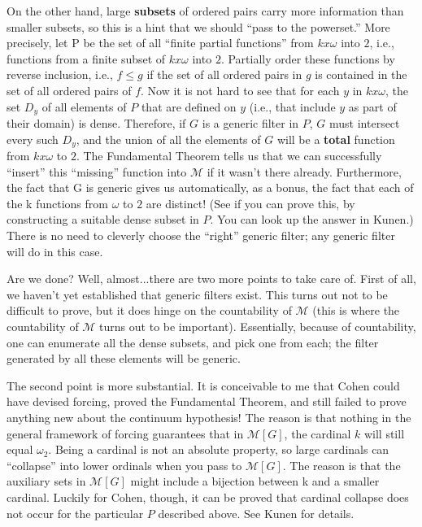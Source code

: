 \documentclass[10pt]{article}
\begin{document}
On the other hand, large \textbf{subsets} of ordered pairs carry more information than smaller subsets, so this is a hint that we should ``pass to the powerset.'' More precisely, let P be the set of all ``finite partial functions'' from $k x \omega$ into $2$, i.e., functions from a finite subset of $k x \omega$ into $2$. Partially order these functions by reverse inclusion, i.e., $f \leq g$ if the set of all ordered pairs in $g$ is contained in the set of all ordered pairs of $f$. Now it is not hard to see that for each $y$ in $k x \omega$, the set $D_y$ of all elements of $P$ that are defined on $y$ (i.e., that include $y$ as part of their domain) is dense. Therefore, if $G$ is a generic filter in $P$, $G$ must intersect every such $D_y$, and the union of all the elements of $G$ will be a \textbf{total} function from $k x \omega$ to $2$. The Fundamental Theorem tells us that we can successfully ``insert'' this ``missing'' function into $\mathcal{M}$ if it wasn't there already. Furthermore, the fact that G is generic gives us automatically, as a bonus, the fact that each of the k functions from $\omega$ to $2$ are distinct! (See if you can prove this, by constructing a suitable dense subset in $P$. You can look up the answer in Kunen.) There is no need to cleverly choose the ``right'' generic filter; any generic filter will do in this case.

Are we done? Well, almost...there are two more points to take care of. First of all, we haven't yet established that generic filters exist. This turns out not to be difficult to prove, but it does hinge on the countability of $\mathcal{M}$ (this is where the countability of $\mathcal{M}$ turns out to be important). Essentially, because of countability, one can enumerate all the dense subsets, and pick one from each; the filter generated by all these elements will be generic.

The second point is more substantial. It is conceivable to me that Cohen could have devised forcing, proved the Fundamental Theorem, and still failed to prove anything new about the continuum hypothesis! The reason is that nothing in the general framework of forcing guarantees that in $\mathcal{M}[G]$, the cardinal $k$ will still equal $\omega_2$. Being a cardinal is not an absolute property, so large cardinals can ``collapse'' into lower ordinals when you pass to $\mathcal{M}[G]$. The reason is that the auxiliary sets in $\mathcal{M}[G]$ might include a bijection between k and a smaller cardinal. Luckily for Cohen, though, it can be proved that cardinal collapse does not occur for the particular $P$ described above. See Kunen for details.
\end{document}
